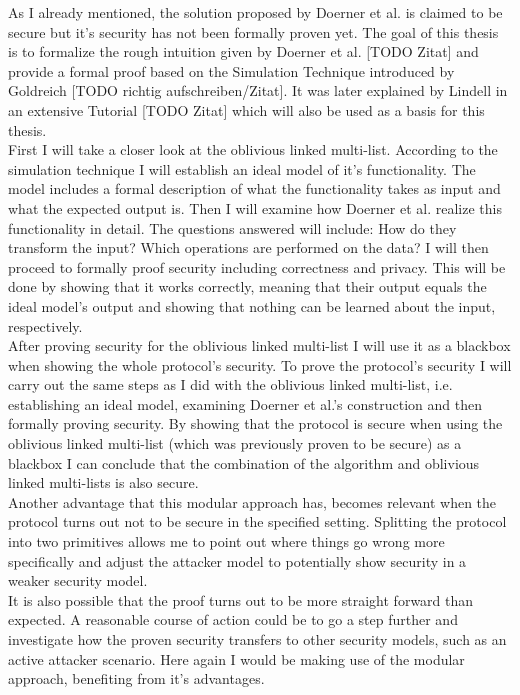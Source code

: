 As I already mentioned, the solution proposed by Doerner et al. is claimed to be secure but it's security has not been formally proven yet. The goal of this thesis is to formalize the rough intuition given by Doerner et al. [TODO Zitat] and provide a formal proof based on the Simulation Technique introduced by Goldreich [TODO richtig aufschreiben/Zitat]. It was later explained by Lindell in an extensive Tutorial [TODO Zitat] which will also be used as a basis for this thesis.\\
First I will take a closer look at the oblivious linked multi-list. According to the simulation technique I will establish an ideal model of it's functionality. The model includes a formal description of what the functionality takes as input and what the expected output is. Then I will examine how Doerner et al. realize this functionality in detail. The questions answered will include: How do they transform the input? Which operations are performed on the data? I will then proceed to formally proof security including correctness and privacy. This will be done by showing that it works correctly, meaning that their output equals the ideal model's output and showing that nothing can be learned about the input, respectively.\\
After proving security for the oblivious linked multi-list I will use it as a blackbox when showing the whole protocol's security. To prove the protocol's security I will carry out the same steps as I did with the oblivious linked multi-list, i.e. establishing an ideal model, examining Doerner et al.'s construction and then formally proving security. By showing that the protocol is secure when using the oblivious linked multi-list (which was previously proven to be secure) as a blackbox I can conclude that the combination of the algorithm and oblivious linked multi-lists is also secure.\\
Another advantage that this modular approach has, becomes relevant when the protocol turns out not to be secure in the specified setting. Splitting the protocol into two primitives allows me to point out where things go wrong more specifically and adjust the attacker model to potentially show security in a weaker security model.\\
It is also possible that the proof turns out to be more straight forward than expected. A reasonable course of action could be to go a step further and investigate how the proven security transfers to other security models, such as an active attacker scenario. Here again I would be making use of the modular approach, benefiting from it's advantages.\\